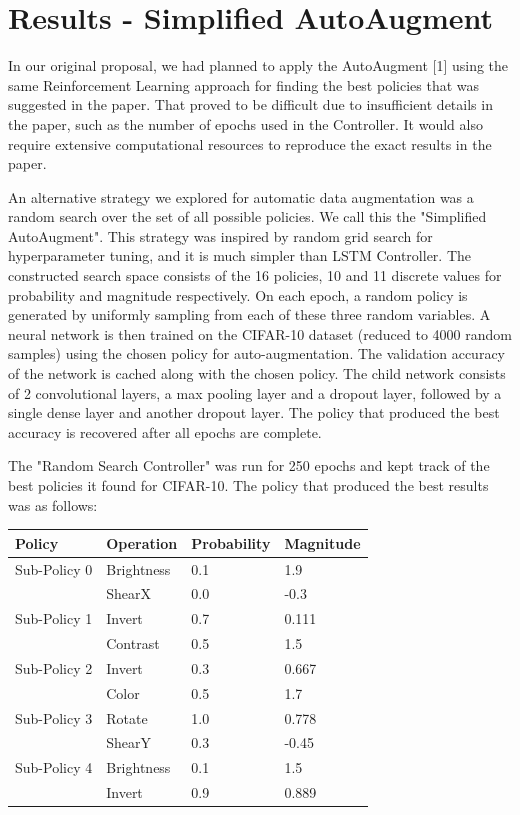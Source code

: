 \documentclass[10pt,twocolumn,letterpaper]{article}
\begin{document}
\section{Results - Simplified AutoAugment}


In our original proposal, we had planned to apply the AutoAugment [1] using the same Reinforcement Learning approach for finding the best policies that was suggested in the paper.  That proved to be difficult due to insufficient details in the paper, such as the number of epochs used in the Controller.  It would also require extensive computational resources to reproduce the exact results in the paper.

An alternative strategy we explored for automatic data augmentation was a random search over the set of all possible policies. We call this the "Simplified AutoAugment".  This strategy was inspired by random grid search for hyperparameter tuning, and it is much simpler than LSTM Controller. The constructed search space consists of the 16 policies, 10 and 11 discrete values for probability and magnitude respectively. On each epoch, a random policy is generated by uniformly sampling from each of these three random variables. A neural network is then trained on the CIFAR-10 dataset (reduced to 4000 random samples) using the chosen policy for auto-augmentation. The validation accuracy of the network is cached along with the chosen policy. The child network consists of 2 convolutional layers, a max pooling layer and a dropout layer, followed by a single dense layer and another dropout layer. The policy that produced the best accuracy is recovered after all epochs are complete.

The "Random Search Controller" was run for 250 epochs and kept track of the best policies it found for CIFAR-10. The policy that produced the best results was as follows:

		\begin{table}[h]
			\begin{tabular}{llll}
				\hline
				Policy &Operation &Probability&Magnitude   \\ \hline
				Sub-Policy 0 &Brightness &0.1&1.9\\
				&ShearX &0.0 &-0.3\\

				Sub-Policy 1 &Invert &0.7&0.111\\
				&Contrast &0.5 &1.5\\

				Sub-Policy 2 &Invert &0.3&0.667\\
				&Color &0.5 &1.7\\

				Sub-Policy 3 &Rotate &1.0&0.778\\
				&ShearY &0.3 &-0.45\\

				Sub-Policy 4 &Brightness &0.1&1.5\\
				&Invert &0.9 &0.889\\
				\hline
			\end{tabular}
		\end{table}
\end{document}
